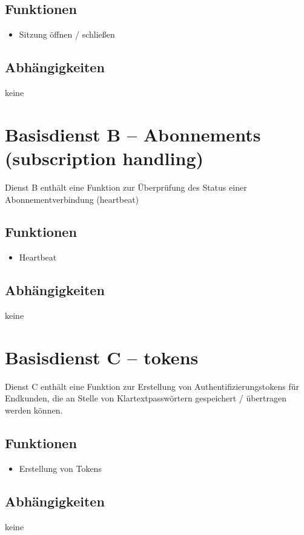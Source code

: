 \subsection*{Funktionen}
\begin{itemize}
\item Sitzung öffnen / schließen
\end{itemize}

\subsection*{Abhängigkeiten}
keine

\section{Basisdienst B -- Abonnements (subscription handling)}
\label{sec:Hierachiemodell:BasisdientB}
Dienst B enthält eine Funktion zur Überprüfung des Status einer Abonnementverbindung (heartbeat)

\subsection*{Funktionen}
\begin{itemize}
\item Heartbeat
\end{itemize}

\subsection*{Abhängigkeiten}
keine

\section{Basisdienst C -- tokens}
\label{sec:Hierachiemodell:BasisdientC}
Dienst C enthält eine Funktion zur Erstellung von Authentifizierungstokens für Endkunden, die an Stelle von Klartextpasswörtern gespeichert / übertragen werden können.

\subsection*{Funktionen}
\begin{itemize}
\item Erstellung von Tokens
\end{itemize}

\subsection*{Abhängigkeiten}
keine


